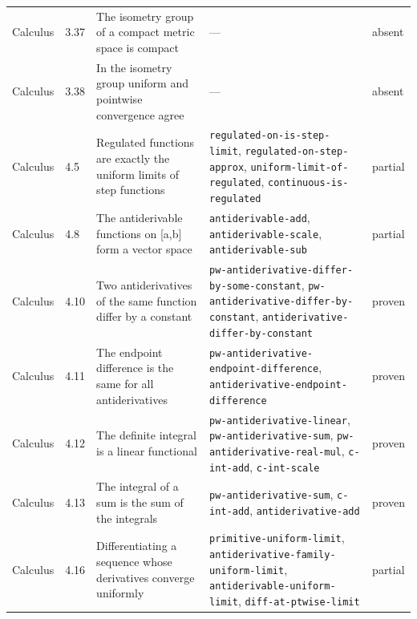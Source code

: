 \begin{longtable}{@{}ll>{\raggedright\arraybackslash}p{4.2cm}>{\raggedright\arraybackslash}p{4.2cm}l@{}}
Calculus & 3.37 & The isometry group of a compact metric space is compact & --- & absent \\
Calculus & 3.38 & In the isometry group uniform and pointwise convergence agree & --- & absent \\
Calculus & 4.5 & Regulated functions are exactly the uniform limits of step functions & \texttt{regulated-\allowbreak{}on-\allowbreak{}is-\allowbreak{}step-\allowbreak{}limit}, \texttt{regulated-\allowbreak{}on-\allowbreak{}step-\allowbreak{}approx}, \texttt{uniform-\allowbreak{}limit-\allowbreak{}of-\allowbreak{}regulated}, \texttt{continuous-\allowbreak{}is-\allowbreak{}regulated} & partial \\
Calculus & 4.8 & The antiderivable functions on [a,b] form a vector space & \texttt{antiderivable-\allowbreak{}add}, \texttt{antiderivable-\allowbreak{}scale}, \texttt{antiderivable-\allowbreak{}sub} & partial \\
Calculus & 4.10 & Two antiderivatives of the same function differ by a constant & \texttt{pw-\allowbreak{}antiderivative-\allowbreak{}differ-\allowbreak{}by-\allowbreak{}some-\allowbreak{}constant}, \texttt{pw-\allowbreak{}antiderivative-\allowbreak{}differ-\allowbreak{}by-\allowbreak{}constant}, \texttt{antiderivative-\allowbreak{}differ-\allowbreak{}by-\allowbreak{}constant} & proven \\
Calculus & 4.11 & The endpoint difference is the same for all antiderivatives & \texttt{pw-\allowbreak{}antiderivative-\allowbreak{}endpoint-\allowbreak{}difference}, \texttt{antiderivative-\allowbreak{}endpoint-\allowbreak{}difference} & proven \\
Calculus & 4.12 & The definite integral is a linear functional & \texttt{pw-\allowbreak{}antiderivative-\allowbreak{}linear}, \texttt{pw-\allowbreak{}antiderivative-\allowbreak{}sum}, \texttt{pw-\allowbreak{}antiderivative-\allowbreak{}real-\allowbreak{}mul}, \texttt{c-\allowbreak{}int-\allowbreak{}add}, \texttt{c-\allowbreak{}int-\allowbreak{}scale} & proven \\
Calculus & 4.13 & The integral of a sum is the sum of the integrals & \texttt{pw-\allowbreak{}antiderivative-\allowbreak{}sum}, \texttt{c-\allowbreak{}int-\allowbreak{}add}, \texttt{antiderivative-\allowbreak{}add} & proven \\
Calculus & 4.16 & Differentiating a sequence whose derivatives converge uniformly & \texttt{primitive-\allowbreak{}uniform-\allowbreak{}limit}, \texttt{antiderivative-\allowbreak{}family-\allowbreak{}uniform-\allowbreak{}limit}, \texttt{antiderivable-\allowbreak{}uniform-\allowbreak{}limit}, \texttt{diff-\allowbreak{}at-\allowbreak{}ptwise-\allowbreak{}limit} & partial \\

\end{longtable}
